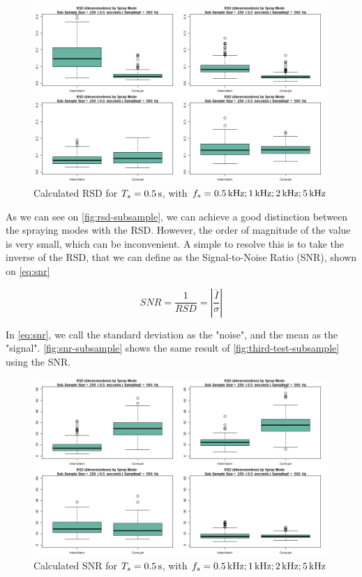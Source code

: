 \documentclass[oneside,12pt]{article}
\begin{document}
\begin{figure}[h!]
    \centering
    \includegraphics[width=\textwidth,trim=1 1 1 1,clip]{figures/rsd-subsample.png}
    \caption{Calculated RSD for $T_s = 0.5 \,\mathrm{s}$, with $f_s = 0.5 \,\mathrm{kHz}; 1 \,\mathrm{kHz}; 2 \,\mathrm{kHz}; 5 \,\mathrm{kHz}$}
    \label{fig:rsd-subsample}
\end{figure}

As we can see on \autoref{fig:rsd-subsample}, we can achieve a good distinction between the spraying modes with the RSD. However, the 
order of magnitude of the value is very small, which can be inconvenient. A simple to resolve this is to take the inverse of the RSD, that 
we can define as the Signal-to-Noise Ratio (SNR), shown on \autoref{eq:snr}

\begin{equation} \label{eq:snr}
    SNR = \frac{1}{RSD} = \left|\frac{\overline{I}}{\sigma}\right|
\end{equation}

In \autoref{eq:snr}, we call the standard deviation as the "noise", and the mean as the "signal". \autoref{fig:snr-subsample} shows the
same result of \autoref{fig:third-test-subsample} using the SNR.

\begin{figure}[h!]
    \centering
    \includegraphics[width=\textwidth,trim=1 1 1 1,clip]{figures/snr-subsample.png}
    \caption{Calculated SNR for $T_s = 0.5 \,\mathrm{s}$, with $f_s = 0.5 \,\mathrm{kHz}; 1 \,\mathrm{kHz}; 2 \,\mathrm{kHz}; 5 \,\mathrm{kHz}$}
    \label{fig:snr-subsample}
\end{figure}
\end{document}
